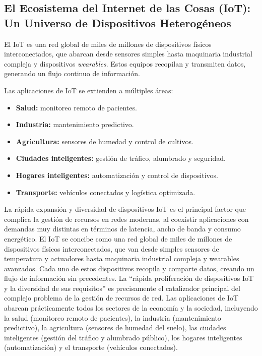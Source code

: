 \documentclass[12pt,a4paper]{article}
\begin{document}
\subsection{El Ecosistema del Internet de las Cosas (IoT): Un Universo de Dispositivos Heterogéneos}

El IoT es una red global de miles de millones de dispositivos físicos interconectados, que abarcan desde sensores simples hasta maquinaria industrial compleja y dispositivos \textit{wearables}. Estos equipos recopilan y transmiten datos, generando un flujo continuo de información.


Las aplicaciones de IoT se extienden a múltiples áreas:
\begin{itemize}
\item \textbf{Salud:} monitoreo remoto de pacientes.
\item \textbf{Industria:} mantenimiento predictivo.
\item \textbf{Agricultura:} sensores de humedad y control de cultivos.
\item \textbf{Ciudades inteligentes:} gestión de tráfico, alumbrado y seguridad.
\item \textbf{Hogares inteligentes:} automatización y control de dispositivos.
\item \textbf{Transporte:} vehículos conectados y logística optimizada.
\end{itemize}


La rápida expansión y diversidad de dispositivos IoT es el principal factor que complica la gestión de recursos en redes modernas, al coexistir aplicaciones con demandas muy distintas en términos de latencia, ancho de banda y consumo energético.
El IoT se concibe como una red global de miles de millones de dispositivos físicos interconectados, que van desde simples sensores de temperatura y actuadores hasta maquinaria industrial compleja y wearables avanzados\cite{ref1}. Cada uno de estos dispositivos recopila y comparte datos, creando un flujo de información sin precedentes. La ``rápida proliferación de dispositivos IoT y la diversidad de sus requisitos'' es precisamente el catalizador principal del complejo problema de la gestión de recursos de red. Las aplicaciones de IoT abarcan prácticamente todos los sectores de la economía y la sociedad, incluyendo la salud (monitoreo remoto de pacientes), la industria (mantenimiento predictivo), la agricultura (sensores de humedad del suelo), las ciudades inteligentes (gestión del tráfico y alumbrado público), los hogares inteligentes (automatización) y el transporte (vehículos conectados).
\end{document}

